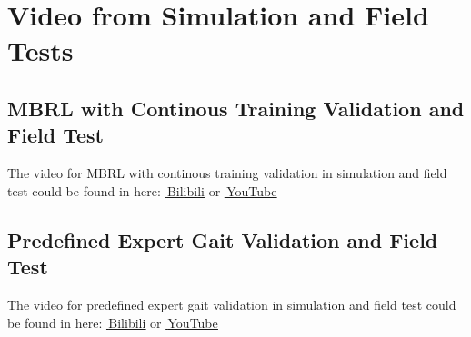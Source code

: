 \section{Video from Simulation and Field Tests}
\label{video}
\subsection*{MBRL with Continous Training Validation and Field Test}
The video for MBRL with continous training validation in simulation and field test could be found in here: \href{https://www.bilibili.com/video/BV1aN411E7VF/?share_source=copy_web&vd_source=8c71542a6d6bba72df2db1c453ecb440}{\faBilibili\,\underline{Bilibili}} or \href{https://youtu.be/C9GSnvQT70A}{\faYoutubePlay\,\underline{YouTube}}

\subsection*{Predefined Expert Gait Validation and Field Test}
The video for predefined expert gait validation in simulation and field test could be found in here: \href{https://www.bilibili.com/video/BV15F41127tu/?share_source=copy_web&vd_source=8c71542a6d6bba72df2db1c453ecb440}{\faBilibili\,\underline{Bilibili}} or \href{https://youtu.be/dFp8ss1kfWc}{\faYoutubePlay\,\underline{YouTube}}